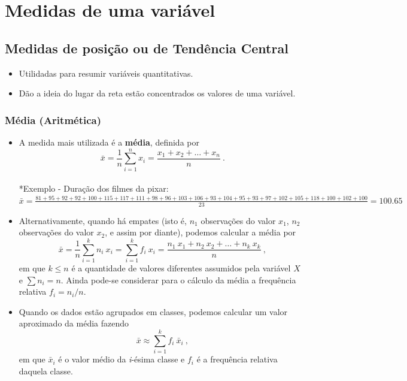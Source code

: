 \documentclass[
]{book}
\providecommand{\tightlist}{%
  \setlength{\itemsep}{0pt}\setlength{\parskip}{0pt}}
\begin{document}
\chapter{Medidas de uma variável}\label{medidas_uma_variavel_5}

\section{Medidas de posição ou de Tendência Central}\label{medidas-de-posiuxe7uxe3o-ou-de-tenduxeancia-central}

\begin{itemize}
\tightlist
\item
  Utilidadas para resumir variáveis quantitativas.\\
\item
  Dão a ideia do lugar da reta estão concentrados os valores de uma variável.
\end{itemize}

\subsection{Média (Aritmética)}\label{muxe9dia-aritmuxe9tica}

\begin{itemize}
\item
  A medida mais utilizada é a \textbf{média}, definida por \[\displaystyle \bar{x} = \frac{1}{n}\sum_{i=1}^n x_i = \dfrac{x_1+x_2+\ldots+x_n}{n}~.\]\\
  *Exemplo - Duração dos filmes da pixar: \(\bar{x} = \frac{81+95+92+92+100+115+117+111+98+96+103+106+93+104+95+93+97+102+105+118+100+102+100}{23}=100.65\)
\item
  Alternativamente, quando há empates (isto é, \(n_1\) observações do valor \(x_1\), \(n_2\) observações do valor \(x_2\), e assim por diante), podemos calcular a média por \[\displaystyle \bar{x} = \frac{1}{n}\sum_{i=1}^k n_i~x_i = \sum_{i=1}^k f_i~x_i = \frac{n_1~x_1+n_2~x_2+\ldots+n_k~x_k}{n}~,\] em que \(k\leq n\) é a quantidade de valores diferentes assumidos pela variável \(X\) e \(\sum n_i = n\). Ainda pode-se considerar para o cálculo da média a frequência relativa \(f_i = n_i/n\).
\item
  Quando os dados estão agrupados em classes, podemos calcular um valor aproximado da média fazendo \[\displaystyle \bar{x} \approx \sum_{i=1}^k f_i~\bar{x}_i~,\] em que \(\bar{x}_i\) é o valor médio da \emph{i}-ésima classe e \(f_i\) é a frequência relativa daquela classe.
\end{itemize}
\end{document}
